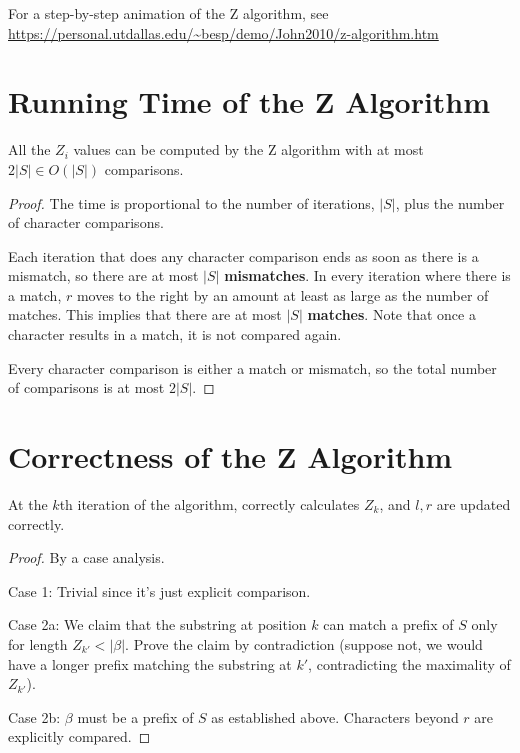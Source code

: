 For a step-by-step animation of the Z algorithm, see \\
\href{https://personal.utdallas.edu/~besp/demo/John2010/z-algorithm.htm}{https://personal.utdallas.edu/\textasciitilde besp/demo/John2010/z-algorithm.htm}

\section{Running Time of the Z Algorithm}

\begin{theorem}
    All the $Z_i$ values can be computed by the Z algorithm with at most $2|S| \in O(|S|)$ comparisons.
\end{theorem}

\begin{proof}
    The time is proportional to the number of iterations, $|S|$, plus the number of character comparisons.
    
    Each iteration that does any character comparison ends as soon as there is a mismatch, so there are at most $|S|$ \textbf{mismatches}. In every iteration where there is a match, $r$ moves to the right by an amount at least as large as the number of matches. This implies that there are at most $|S|$ \textbf{matches}. Note that once a character results in a match, it is not compared again.

    Every character comparison is either a match or mismatch, so the total number of comparisons is at most $2|S|$.
\end{proof}

\section{Correctness of the Z Algorithm}

\begin{theorem}
    At the $k$th iteration of the algorithm,  correctly calculates $Z_k$, and $l,r$ are updated correctly.
\end{theorem}

\begin{proof}
    By a case analysis.

    Case 1: Trivial since it's just explicit comparison.

    Case 2a: We claim that the substring at position $k$ can match a prefix of $S$ only for length $Z_{k'} < |\beta|$. Prove the claim by contradiction (suppose not, we would have a longer prefix matching the substring at $k'$, contradicting the maximality of $Z_{k'}$).

    Case 2b: $\beta$ must be a prefix of $S$ as established above. Characters beyond $r$ are explicitly compared.
\end{proof}

